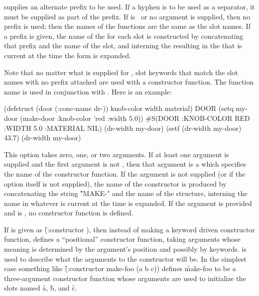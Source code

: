  supplies an alternate
prefix to be used.  If a hyphen is to be used as a separator,
it must be supplied as part of the prefix.
If  is \nil\ or no argument is supplied, 
then no prefix is used;
then the names of the  functions
are the same as the slot names.
If a  prefix is given,
the name of the   for each slot is constructed by
concatenating that prefix and the name of the slot, and interning the resulting
 in the  that is current at the time the 
 form is expanded.

Note that no matter what is supplied for ,
slot keywords that match the slot names with no prefix attached are used
with a constructor function.
The  function name is used
in conjunction with .  Here is an example:

%

\code
 (defstruct (door (:conc-name dr-)) knob-color width material) \EV DOOR
 (setq my-door (make-door :knob-color 'red :width 5.0)) 
\EV #S(DOOR :KNOB-COLOR RED :WIDTH 5.0 :MATERIAL NIL)
 (dr-width my-door) 
 (setf (dr-width my-door) 43.7) 
 (dr-width my-door) 
\endcode



This option takes zero, one, or two arguments.
If at least one argument is supplied and the first argument is not \nil, then
that argument is a  which specifies the name of the 
constructor function.  If the argument is not supplied (or if the option itself is not
supplied), the name of the constructor is produced by concatenating the
string \f{"MAKE-"} and the name of the structure, interning the name
in whatever  is current at the time 
is expanded.  If the argument is provided and is \nil,
no constructor function is defined.

If  is given as
\f{(:constructor  )}, 
then instead of making a keyword
driven constructor function,  
defines a ``positional'' constructor function,
taking arguments whose meaning is determined by the argument's position
and possibly by keywords.
 is used to describe what the arguments to the
constructor will be. In the simplest case something like
\f{(:constructor make-foo (a b c))} defines \f{make-foo} to be
a three-argument 
constructor function whose arguments are used to initialize the
slots named \f{a}, \f{b}, and \f{c}.

